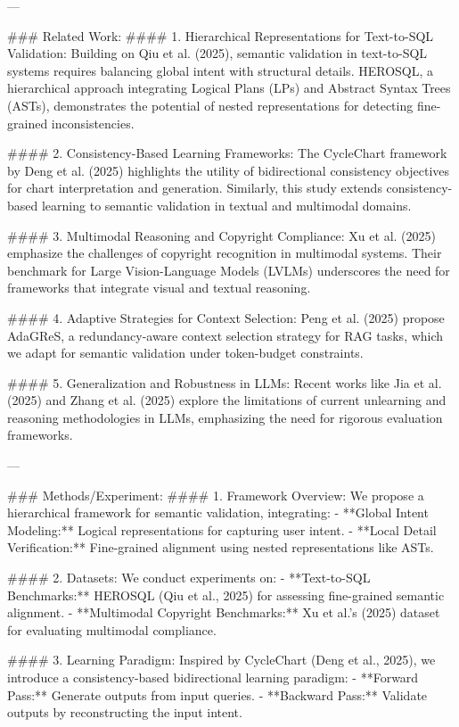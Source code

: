 ---

### Related Work:
#### 1. Hierarchical Representations for Text-to-SQL Validation:
Building on Qiu et al. (2025), semantic validation in text-to-SQL systems requires balancing global intent with structural details. HEROSQL, a hierarchical approach integrating Logical Plans (LPs) and Abstract Syntax Trees (ASTs), demonstrates the potential of nested representations for detecting fine-grained inconsistencies.

#### 2. Consistency-Based Learning Frameworks:
The CycleChart framework by Deng et al. (2025) highlights the utility of bidirectional consistency objectives for chart interpretation and generation. Similarly, this study extends consistency-based learning to semantic validation in textual and multimodal domains.

#### 3. Multimodal Reasoning and Copyright Compliance:
Xu et al. (2025) emphasize the challenges of copyright recognition in multimodal systems. Their benchmark for Large Vision-Language Models (LVLMs) underscores the need for frameworks that integrate visual and textual reasoning.

#### 4. Adaptive Strategies for Context Selection:
Peng et al. (2025) propose AdaGReS, a redundancy-aware context selection strategy for RAG tasks, which we adapt for semantic validation under token-budget constraints.

#### 5. Generalization and Robustness in LLMs:
Recent works like Jia et al. (2025) and Zhang et al. (2025) explore the limitations of current unlearning and reasoning methodologies in LLMs, emphasizing the need for rigorous evaluation frameworks.

---

### Methods/Experiment:
#### 1. Framework Overview:
We propose a hierarchical framework for semantic validation, integrating:
- **Global Intent Modeling:** Logical representations for capturing user intent.
- **Local Detail Verification:** Fine-grained alignment using nested representations like ASTs.

#### 2. Datasets:
We conduct experiments on:
- **Text-to-SQL Benchmarks:** HEROSQL (Qiu et al., 2025) for assessing fine-grained semantic alignment.
- **Multimodal Copyright Benchmarks:** Xu et al.’s (2025) dataset for evaluating multimodal compliance.

#### 3. Learning Paradigm:
Inspired by CycleChart (Deng et al., 2025), we introduce a consistency-based bidirectional learning paradigm:
- **Forward Pass:** Generate outputs from input queries.
- **Backward Pass:** Validate outputs by reconstructing the input intent.

